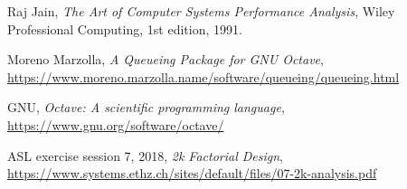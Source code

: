 \documentclass[11pt,a4paper]{article}
\begin{document}
\begin{thebibliography}{9}

  Raj Jain,
  \textit{The Art of Computer Systems Performance Analysis},
  Wiley Professional Computing, 1st edition, 1991.

    Moreno Marzolla,
    \textit{A Queueing Package for GNU Octave},
    \url{https://www.moreno.marzolla.name/software/queueing/queueing.html}
    
    GNU,
    \textit{Octave: A scientific programming language},
    \url{https://www.gnu.org/software/octave/}

    ASL exercise session 7, 2018,
    \textit{2k Factorial Design},
    \url{https://www.systems.ethz.ch/sites/default/files/07-2k-analysis.pdf}
\end{thebibliography}
\end{document}
